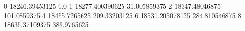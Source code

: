 0 18246.39453125 0.0
1 18277.400390625 31.005859375
2 18347.48046875 101.0859375
4 18455.7265625 209.33203125
6 18531.205078125 284.810546875
8 18635.37109375 388.9765625
